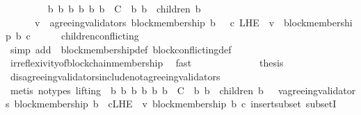\begin{isabellebody}
\ \ \isamarkupfalse%
\ {\isachardoublequoteopen}{\isasymforall}\ {\isasymsigma}\ {\isasymin}\ {\isasymSigma}{\isachardot}\ {\isasymforall}\ b\ b{}\ b{}{\isachardot}\ {\isacharbraceleft}b{\isacharcomma}\ b{}{\isacharcomma}\ b{}{\isacharbraceright}\ {\isasymsubseteq}\ C\ {\isasymand}\ {\isacharbraceleft}b{}{\isacharcomma}\ b{}{\isacharbraceright}\ {\isasymsubseteq}\ children\ {\isacharparenleft}b{\isacharcomma}\ {\isasymsigma}{\isacharparenright}\isanewline
\ \ \ {\isasymlongrightarrow}\ \ {\isacharparenleft}{\isasymforall}\ v\ {\isasymin}\ agreeing{\isacharunderscore}validators\ {\isacharparenleft}block{\isacharunderscore}membership\ b{}{\isacharcomma}\ {\isasymsigma}{\isacharparenright}{\isachardot}\ {\isasymexists}\ c\ {\isasymin}L{\isacharunderscore}H{\isacharunderscore}E\ {\isasymsigma}\ v{\isachardot}\ {\isasymnot}\ block{\isacharunderscore}membership\ b{}\ c{\isacharparenright}{\isachardoublequoteclose}\isanewline
\ \ \ \ \isamarkupfalse%
\ children{\isacharunderscore}conflicting\isanewline
\ \ \ \ \isamarkupfalse%
\ {\isacharparenleft}simp\ add{\isacharcolon}\ \ block{\isacharunderscore}membership{\isacharunderscore}def\ block{\isacharunderscore}conflicting{\isacharunderscore}def{\isacharparenright}\isanewline
\ \ \ \ \isamarkupfalse%
\ irreflexivity{\isacharunderscore}of{\isacharunderscore}blockchain{\isacharunderscore}membership\ \isamarkupfalse%
\ fast\ \ \ \ \ \ \ \ \isanewline
\ \ \isamarkupfalse%
\ \isamarkupfalse%
\ {\isacharquery}thesis\isanewline
\ \ \ \ \isamarkupfalse%
\ disagreeing{\isacharunderscore}validators{\isacharunderscore}include{\isacharunderscore}not{\isacharunderscore}agreeing{\isacharunderscore}validators\isanewline
\ \ \ \ \isamarkupfalse%
\ {\isacharparenleft}metis\ {\isacharparenleft}no{\isacharunderscore}types{\isacharcomma}\ lifting{\isacharparenright}\ {\isacartoucheopen}{\isasymforall}{\isasymsigma}{\isasymin}{\isasymSigma}{\isachardot}\ {\isasymforall}b\ b{}\ b{}{\isachardot}\ {\isacharbraceleft}b{\isacharcomma}\ b{}{\isacharcomma}\ b{}{\isacharbraceright}\ {\isasymsubseteq}\ C\ {\isasymand}\ {\isacharbraceleft}b{}{\isacharcomma}\ b{}{\isacharbraceright}\ {\isasymsubseteq}\ children\ {\isacharparenleft}b{\isacharcomma}\ {\isasymsigma}{\isacharparenright}\ {\isasymlongrightarrow}\ {\isacharparenleft}{\isasymforall}v{\isasymin}agreeing{\isacharunderscore}validators\ {\isacharparenleft}block{\isacharunderscore}membership\ b{}{\isacharcomma}\ {\isasymsigma}{\isacharparenright}{\isachardot}\ {\isasymforall}c{\isasymin}L{\isacharunderscore}H{\isacharunderscore}E\ {\isasymsigma}\ v{\isachardot}\ block{\isacharunderscore}membership\ b{}\ c{\isacharparenright}{\isacartoucheclose}\ insert{\isacharunderscore}subset\ subsetI{\isacharparenright}\ \ \ \ \isanewline

\end{isabellebody}
